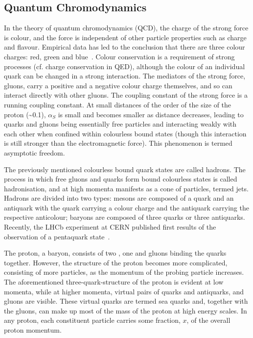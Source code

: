 \subsection{Quantum Chromodynamics}
\label{ss:quantum_chromodynamics}

In the theory of quantum chromodynamics (QCD), the charge of the strong force is colour, and the force is
independent of other particle properties such as charge and flavour. Empirical data has led to the conclusion
that there are three colour charges: red, green and blue~\cite{Griffiths:1987tj}. Colour conservation is a
requirement of strong processes (cf. charge conservation in QED), although the colour of an individual quark
can be changed in a strong interaction. The mediators of the strong force, gluons, carry a positive and a
negative colour charge themselves, and so can interact directly with other gluons. The coupling constant of
the strong force is a running coupling constant. At small distances of the order of the size of the proton
(\textasciitilde0.1\fm), $\alpha_{S}$ is small and becomes smaller as distance decreases, leading to quarks
and gluons being essentially free particles and interacting weakly with each other when confined within
colourless bound states (though this interaction is still stronger than the electromagnetic force). This
phenomenon is termed asymptotic freedom.

The previously mentioned colourless bound quark states are called hadrons. The process in which free gluons
and quarks form bound colourless states is called hadronisation, and at high momenta manifests as a cone of
particles, termed jets. Hadrons are divided into two types: mesons are composed of a quark and an antiquark
with the quark carrying a colour charge and the antiquark carrying the respective anticolour; baryons are
composed of three quarks or three antiquarks. Recently, the LHCb experiment at CERN published first results of
the observation of a pentaquark state~\cite{Aaij:2015tga}.

The proton, a baryon, consists of two \uquarks, one \dquark and gluons binding the quarks together. However,
the structure of the proton becomes more complicated, consisting of more particles, as the momentum of the
probing particle increases. The aforementioned three-quark-structure of the proton is evident at low momenta,
while at higher momenta, virtual pairs of quarks and antiquarks, and gluons are visible. These virtual quarks
are termed sea quarks and, together with the gluons, can make up most of the mass of the proton at high energy
scales. In any proton, each constituent particle carries some fraction, $x$, of the overall proton momentum.


